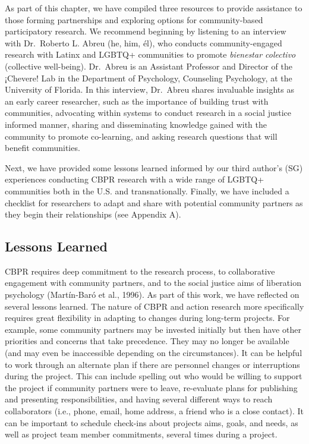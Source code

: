 \documentclass[
  11pt,
]{book}
\begin{document}
As part of this chapter, we have compiled three resources to provide assistance to those forming partnerships and exploring options for community-based participatory research. We recommend beginning by listening to an interview with Dr.~Roberto L. Abreu (he, him, él), who conducts community-engaged research with Latinx and LGBTQ+ communities to promote \emph{bienestar colectivo} (collective well-being). Dr.~Abreu is an Assistant Professor and Director of the ¡Chevere! Lab in the Department of Psychology, Counseling Psychology, at the University of Florida. In this interview, Dr.~Abreu shares invaluable insights as an early career researcher, such as the importance of building trust with communities, advocating within systems to conduct research in a social justice informed manner, sharing and disseminating knowledge gained with the community to promote co-learning, and asking research questions that will benefit communities.

Next, we have provided some lessons learned informed by our third author's (SG) experiences conducting CBPR research with a wide range of LGBTQ+ communities both in the U.S. and transnationally. Finally, we have included a checklist for researchers to adapt and share with potential community partners as they begin their relationships (see Appendix A).

\subsection{Lessons Learned}\label{lessons-learned}

CBPR requires deep commitment to the research process, to collaborative engagement with community partners, and to the social justice aims of liberation psychology (Martín-Baró et al., 1996). As part of this work, we have reflected on several lessons learned. The nature of CBPR and action research more specifically requires great flexibility in adapting to changes during long-term projects. For example, some community partners may be invested initially but then have other priorities and concerns that take precedence. They may no longer be available (and may even be inaccessible depending on the circumstances). It can be helpful to work through an alternate plan if there are personnel changes or interruptions during the project. This can include spelling out who would be willing to support the project if community partners were to leave, re-evaluate plans for publishing and presenting responsibilities, and having several different ways to reach collaborators (i.e., phone, email, home address, a friend who is a close contact). It can be important to schedule check-ins about projects aims, goals, and needs, as well as project team member commitments, several times during a project.
\end{document}
